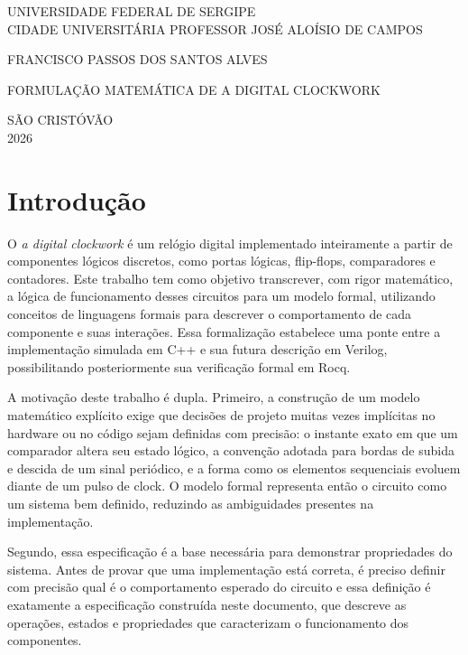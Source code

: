 \documentclass[a4paper,12pt]{article}
\begin{document}
\begin{titlepage}
\centering

    UNIVERSIDADE FEDERAL DE SERGIPE\\
    CIDADE UNIVERSITÁRIA PROFESSOR JOSÉ ALOÍSIO DE CAMPOS

\vspace{4cm}

    FRANCISCO PASSOS DOS SANTOS ALVES

\vspace{4cm}

    FORMULAÇÃO MATEMÁTICA DE A DIGITAL CLOCKWORK
\vfill

    SÃO CRISTÓVÃO\\
    2026

\end{titlepage}

\clearpage
{}


\newpage
\tableofcontents
\newpage


\section{Introdução}

O \textit{a digital clockwork} é um relógio digital implementado inteiramente a partir de componentes lógicos discretos, como portas lógicas, flip-flops, comparadores e contadores. Este trabalho tem como objetivo transcrever, com rigor matemático, a lógica de funcionamento desses circuitos para um modelo formal, utilizando conceitos de linguagens formais para descrever o comportamento de cada componente e suas interações. Essa formalização estabelece uma ponte entre a implementação simulada em C++ e sua futura descrição em Verilog, possibilitando posteriormente sua verificação formal em Rocq.

A motivação deste trabalho é dupla. Primeiro, a construção de um modelo matemático explícito exige que decisões de projeto muitas vezes implícitas no hardware ou no código sejam definidas com precisão: o instante exato em que um comparador altera seu estado lógico, a convenção adotada para bordas de subida e descida de um sinal periódico, e a forma como os elementos sequenciais evoluem diante de um pulso de clock. O modelo formal representa então o circuito como um sistema bem definido, reduzindo as ambiguidades presentes na implementação.

Segundo, essa especificação é a base necessária para demonstrar propriedades do sistema. Antes de provar que uma implementação está correta, é preciso definir com precisão qual é o comportamento esperado do circuito e essa definição é exatamente a especificação construída neste documento, que descreve as operações, estados e propriedades que caracterizam o funcionamento dos componentes.
\end{document}
